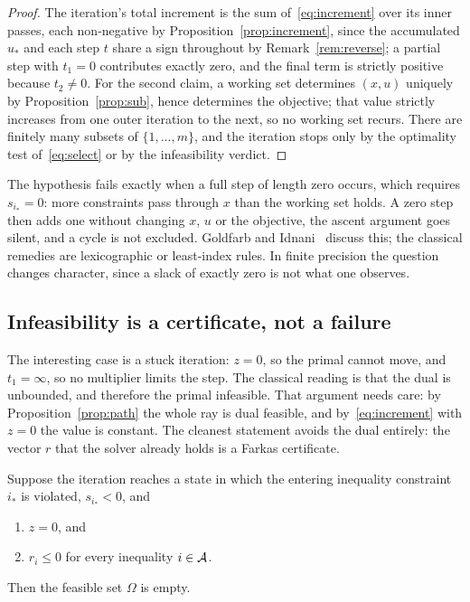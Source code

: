 \begin{proof}
The iteration's total increment is the sum of~\eqref{eq:increment} over its inner
passes, each non-negative by Proposition~\ref{prop:increment}, since the
accumulated $u_*$ and each step $t$ share a sign throughout by
Remark~\ref{rem:reverse}; a partial step with $t_1 = 0$ contributes exactly zero,
and the final term is strictly positive because $t_2 \neq 0$. For the second claim, a working set
determines $(x,u)$ uniquely by Proposition~\ref{prop:sub}, hence determines the
objective; that value strictly increases from one outer iteration to the next, so
no working set recurs. There are finitely many subsets of $\{1,\dots,m\}$, and the
iteration stops only by the optimality test of~\eqref{eq:select} or by the
infeasibility verdict.
\end{proof}

\begin{remark}[Degeneracy]\label{rem:degeneracy}
The hypothesis fails exactly when a full step of length zero occurs, which requires
$s_{i_*} = 0$: more constraints pass through $x$ than the working set holds. A zero
step then adds one without changing $x$, $u$ or the objective, the ascent argument
goes silent, and a cycle is not excluded. Goldfarb and Idnani~\cite{goldfarb1983}
discuss this; the classical remedies are lexicographic or least-index rules. In
finite precision the question changes character, since a slack of exactly zero is
not what one observes.
\end{remark}

\subsection{Infeasibility is a certificate, not a failure}

The interesting case is a stuck iteration: $z = 0$, so the primal cannot move, and
$t_1 = \infty$, so no multiplier limits the step. The classical reading is that
the dual is unbounded, and therefore the primal infeasible. That argument needs
care: by Proposition~\ref{prop:path} the whole ray is dual feasible, and
by~\eqref{eq:increment} with $z = 0$ the value is constant. The cleanest
statement avoids the dual entirely: the vector $r$ that the solver already holds
is a Farkas certificate.

\begin{proposition}\label{prop:farkas}
Suppose the iteration reaches a state in which the entering inequality
constraint $i_*$ is violated, $s_{i_*} < 0$, and
\begin{enumerate}
  \item[(a)] $z = 0$, and
  \item[(b)] $r_i \le 0$ for every inequality $i \in \mathcal{A}$.
\end{enumerate}
Then the feasible set $\Omega$ is empty.
\end{proposition}

